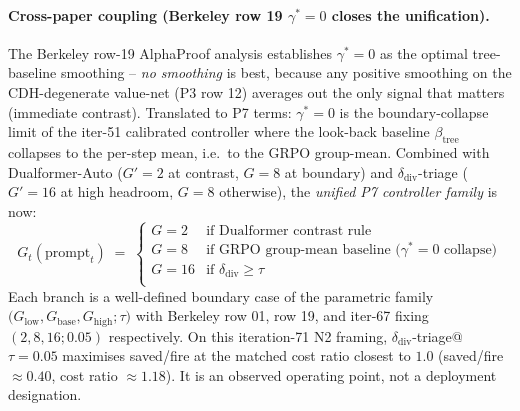 \paragraph{Cross-paper coupling (Berkeley row 19 $\gamma^*{=}0$ closes the unification).}
The Berkeley row-19 AlphaProof analysis \citep{alphaproof2025nature}
establishes $\gamma^*{=}0$ as the optimal tree-baseline smoothing --
\emph{no smoothing} is best, because any positive smoothing on the
CDH-degenerate value-net (P3 row 12) averages out the only signal
that matters (immediate contrast). Translated to P7 terms:
$\gamma^*{=}0$ is the boundary-collapse limit of the iter-51
calibrated controller where the look-back baseline $\beta_{\mathrm{tree}}$
collapses to the per-step mean, i.e.\ to the GRPO group-mean.
Combined with Dualformer-Auto ($G'{=}2$ at contrast, $G{=}8$ at
boundary) and $\delta_{\mathrm{div}}$-triage ($G'{=}16$ at high
headroom, $G{=}8$ otherwise), the \emph{unified P7 controller family}
is now:
\begin{equation*}
G_t(\mathrm{prompt}_t) \;=\; \begin{cases}
G{=}2  & \text{if Dualformer contrast rule} \\
G{=}8  & \text{if GRPO group-mean baseline ($\gamma^*{=}0$ collapse)} \\
G{=}16 & \text{if $\delta_{\mathrm{div}} \geq \tau$} \\
\end{cases}
\end{equation*}
Each branch is a well-defined boundary case of the parametric family
$\bigl(G_{\mathrm{low}}, G_{\mathrm{base}}, G_{\mathrm{high}}; \tau\bigr)$
with Berkeley row 01, row 19, and iter-67 fixing
$(2, 8, 16; 0.05)$ respectively. On this iteration-71 N2 framing,
$\delta_{\mathrm{div}}$-triage@$\tau{=}0.05$ maximises saved/fire at the
matched cost ratio closest to $1.0$ (saved/fire $\approx 0.40$, cost ratio
$\approx 1.18$). It is an observed operating point, not a deployment designation.

